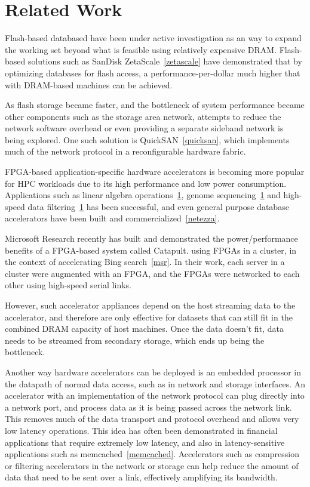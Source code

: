 
\section{Related Work}

Flash-based databased have been under active investigation as an way to expand
the working set beyond what is feasible using relatively expensive DRAM.
Flash-based solutions such as SanDisk ZetaScale~\ref{zetascale} have
demonstrated that by optimizing databases for flash access, a
performance-per-dollar much higher that with DRAM-based machines can be
achieved.

As flash storage became faster, and the bottleneck of system performance became
other components such as the storage area network, attempts to reduce the
network software overhead or even providing a separate sideband network is being
explored. One such solution is QuickSAN~\ref{quicksan}, which implements much of
the network protocol in a reconfigurable hardware fabric.

FPGA-based application-specific hardware accelerators is becoming more popular
for HPC workloads due to its high performance and low power consumption.
Applications such as linear algebra operations~\ref{}, genome sequencing~\ref{}
and high-speed data filtering~\ref{} has been successful, and even general
purpose database accelerators have been built and commercialized~\ref{netezza}.

Microsoft Research recently has built and demonstrated the power/performance
benefits of a FPGA-based system called Catapult.
using FPGAs in a cluster, in the context of accelerating Bing
search~\ref{msr}. In their work, each server in a cluster were augmented with an FPGA, and
the FPGAs were networked to each other using high-speed serial links.

However, such accelerator appliances depend on the host streaming data to the
accelerator, and therefore are only effective for datasets that can
still fit in the combined DRAM capacity of host machines. Once the data doesn't
fit, data needs to be streamed from secondary storage, which ends up being the
bottleneck.

Another way hardware accelerators can be deployed is an embedded processor in
the datapath of normal data access, such as in network and storage interfaces. 
An accelerator with an implementation of the
network protocol can plug directly into a network
port, and process data as it is being passed across the network link. This
removes much of the data transport and protocol overhead and allows very low
latency operations. This idea has often been demonstrated in financial
applications that require extremely low latency, and also in latency-sensitive
applications such as memcached~\ref{memcached}. Accelerators such as compression
or filtering accelerators in the network or storage can help reduce the amount
of data that need to be sent over a link, effectively amplifying its bandwidth.



